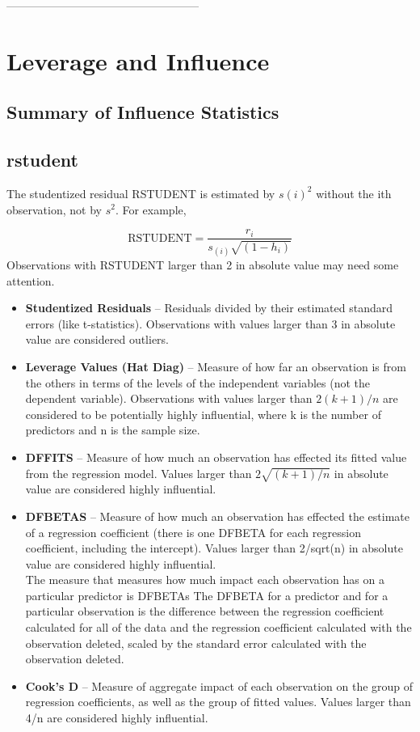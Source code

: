 \documentclass[residuals.tex]{subfiles}
\begin{document}
\Large

--------------------------------------------------- %
	\section{Leverage and Influence}
	
	\subsection{Summary of Influence Statistics}
	\subsection{rstudent}
	The studentized residual RSTUDENT is estimated by $s(i)^2$ without the ith observation, not by $s^2$. For example,
	
	\[\mbox{RSTUDENT} = \frac{r_i}{s_{(i)} \sqrt{(1 - h_i)}} \]
	Observations with RSTUDENT larger than 2 in absolute value may need some attention.
	
	
	
	
	
	\begin{itemize}
		\item	\textbf{Studentized Residuals} – Residuals divided by their estimated standard errors (like t-statistics). Observations with values larger than 3 in absolute value are considered outliers.
		\item	\textbf{Leverage Values (Hat Diag)} – Measure of how far an observation is from the others in terms of the levels of the independent variables (not the dependent variable). Observations with values larger than $2(k+1)/n$ are considered to be potentially highly influential, where k is the number of predictors and n is the sample size.
		\item	\textbf{DFFITS} – Measure of how much an observation has effected its fitted value from the regression model. Values larger than $2\sqrt{(k+1)/n}$ in absolute value are considered highly influential. %
		\item	\textbf{DFBETAS} – Measure of how much an observation has effected the estimate of a regression coefficient (there is one DFBETA for each regression coefficient, including the intercept). Values larger than 2/sqrt(n) in absolute value are considered highly influential.
		\\
		The measure that measures how much impact each observation has on a particular predictor is DFBETAs The DFBETA for a predictor and for a particular observation is the difference between the regression coefficient calculated for all of the data and the regression coefficient calculated with the observation deleted, scaled by the standard error calculated with the observation deleted. 
		
		\item	\textbf{Cook’s D} – Measure of aggregate impact of each observation on the group of regression coefficients, as well as the group of fitted values. Values larger than 4/n are considered highly influential.
	\end{itemize}
	
\end{document}
